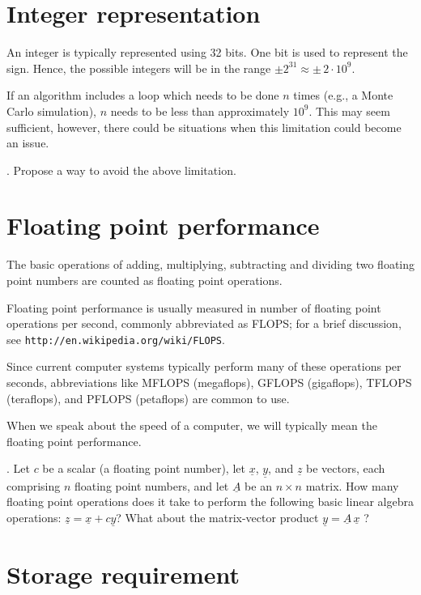 \section{Integer representation}

An integer is typically represented using 32 bits. One bit is used to represent
the sign. Hence, the possible integers will be in the range $\pm 2^{31} \approx
\pm \, 2\cdot 10^9$.

If an algorithm includes a loop which needs to be done $n$ times (e.g., a Monte
Carlo simulation), $n$ needs to be less than approximately $10^9$. This may seem
sufficient, however, there could be situations when this limitation could become
an issue.

. Propose a way to avoid the above limitation.

\section{Floating point performance}

The basic operations of adding, multiplying, subtracting and dividing two
floating point numbers are counted as floating point operations.

Floating point performance is usually measured in number of floating point
operations per second, commonly abbreviated as FLOPS; for a brief discussion,
see \texttt{http://en.wikipedia.org/wiki/FLOPS}.

Since current computer systems typically perform many of these operations per
seconds, abbreviations like MFLOPS (megaflops), GFLOPS (gigaflops), TFLOPS
(teraflops), and PFLOPS (petaflops) are common to use.

When we speak about the speed of a computer, we will typically mean the floating
point performance.

. Let $c$ be a scalar (a floating point number),
let $\underline{x}$, $\underline{y}$, and $\underline{z}$ be vectors, each
comprising $n$ floating point numbers, and let $\underline{A}$ be an $n\times n$
matrix. How many floating point operations does it take to perform the following
basic linear algebra operations: $\underline{z} = \underline{x} + c
\underline{y}$? What about the matrix-vector product $\underline{y} =
\underline{A}\,\underline{x}$ ?\\

\section{Storage requirement}

